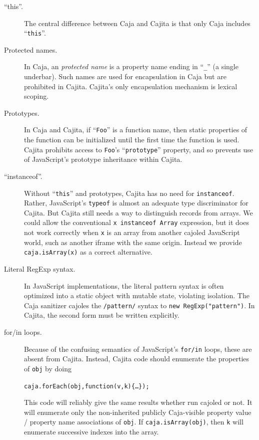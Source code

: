 \documentclass[letterpaper,twocolumn,10pt]{article}
\newcommand{\code}[1]{{\tt {#1}}}              %
\begin{document}
\begin{description}
    
    \item[``this''.] The central difference between Caja and Cajita is that only Caja includes ``\code{this}''.
    
    \item[Protected names.] In Caja, an \emph{protected name} is a property name ending in ``\code{\_}'' (a single 
    underbar). Such names are used for encapsulation in Caja but are prohibited in Cajita. Cajita's only 
    encapsulation mechanism is lexical scoping.
    
    \item[Prototypes.] In Caja and Cajita, if ``\code{Foo}'' is a function name, then static properties of the 
    function can be initialized until the first time the function is used. Cajita prohibits access to \code{Foo}'s 
    ``\code{prototype}'' property, and so prevents use of JavaScript's prototype inheritance within Cajita.
    
    \item[``instanceof''.] Without ``\code{this}'' and prototypes, Cajita has no need for \code{instanceof}. Rather, 
    JavaScript's \code{typeof} is almost an adequate type discriminator for Cajita. But Cajita still needs a way to 
    distinguish records from arrays. We could allow the conventional \code{x instanceof Array} expression, but it 
    does not work correctly when \code{x} is an array from another cajoled JavaScript world, such as another iframe 
    with the same origin. Instead we provide \code{caja.isArray(x)} as a correct alternative.
    
    \item[Literal RegExp syntax.] In JavaScript implementations, the literal pattern syntax is often optimized into a 
    static object with mutable state, violating isolation. The Caja sanitizer cajoles the \code{/pattern/} syntax to 
    \code{new RegExp("pattern")}. In Cajita, the second form must be written explicitly.
    
    \item[for/in loops.] Because of the confusing semantics of JavaScript's \code{for/in} loops, these are absent 
    from Cajita. Instead, Cajita code should enumerate the properties of \code{obj} by doing
%
\begin{alltt}caja.forEach(obj,function(v,k)\{{\ldots}\});\end{alltt}
%
    This code will reliably give the same results whether run cajoled or not. It will enumerate only the 
    non-inherited publicly Caja-visible property value / property name associations of \code{obj}. If 
    \code{caja.isArray(obj)}, then \code{k} will enumerate successive indexes into the array.
    

\end{description}
\end{document}
